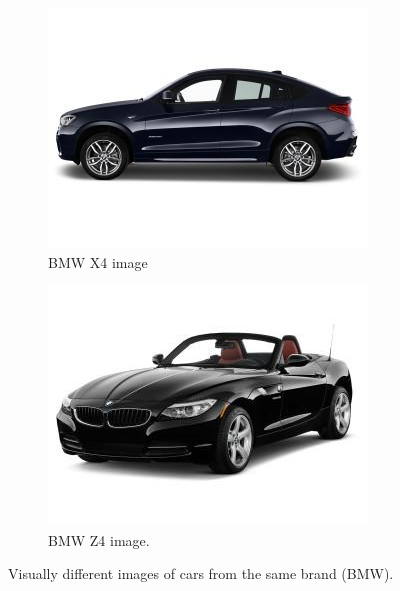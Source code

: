 \documentclass[conference]{IEEEtran}
\begin{document}
\begin{figure}[t]
    \centering
    \begin{subfigure}[b]{0.48\linewidth}        %
        \centering
        \includegraphics[width=0.96\linewidth]{BMW_X4_2015_44_18_240_20_4_74_63_184_20_AWD_5_4_SUV_zYa.jpg}
        \caption{BMW X4 image}
        \label{fig:bmwx4}
    \end{subfigure}
    \begin{subfigure}[b]{0.48\linewidth}        %
        \centering
        \includegraphics[width=0.96\linewidth]{BMW_Z4_2014_48_17_240_20_4_70_50_166_22_RWD_2_2_Convertible_hra.jpg}
        \caption{BMW Z4 image.}
        \label{fig:bmwz4}
    \end{subfigure}
    \caption{Visually different images of cars from the same brand (BMW).}
    \label{fig:bmw}
\end{figure}
\end{document}
